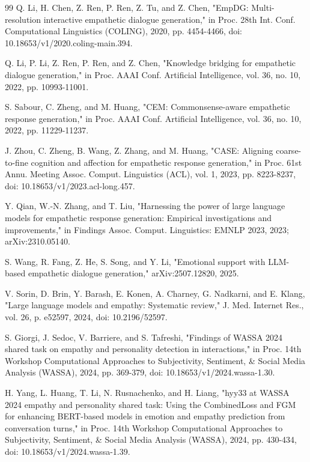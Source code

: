 \begin{thebibliography}{99}
Q. Li, H. Chen, Z. Ren, P. Ren, Z. Tu, and Z. Chen, "EmpDG: Multi-resolution interactive empathetic dialogue generation," in Proc. 28th Int. Conf. Computational Linguistics (COLING), 2020, pp. 4454-4466, doi: 10.18653/v1/2020.coling-main.394.

Q. Li, P. Li, Z. Ren, P. Ren, and Z. Chen, "Knowledge bridging for empathetic dialogue generation," in Proc. AAAI Conf. Artificial Intelligence, vol. 36, no. 10, 2022, pp. 10993-11001.

S. Sabour, C. Zheng, and M. Huang, "CEM: Commonsense-aware empathetic response generation," in Proc. AAAI Conf. Artificial Intelligence, vol. 36, no. 10, 2022, pp. 11229-11237.

J. Zhou, C. Zheng, B. Wang, Z. Zhang, and M. Huang, "CASE: Aligning coarse-to-fine cognition and affection for empathetic response generation," in Proc. 61st Annu. Meeting Assoc. Comput. Linguistics (ACL), vol. 1, 2023, pp. 8223-8237, doi: 10.18653/v1/2023.acl-long.457.

Y. Qian, W.-N. Zhang, and T. Liu, "Harnessing the power of large language models for empathetic response generation: Empirical investigations and improvements," in Findings Assoc. Comput. Linguistics: EMNLP 2023, 2023; arXiv:2310.05140.

S. Wang, R. Fang, Z. He, S. Song, and Y. Li, "Emotional support with LLM-based empathetic dialogue generation," arXiv:2507.12820, 2025.

V. Sorin, D. Brin, Y. Barash, E. Konen, A. Charney, G. Nadkarni, and E. Klang, "Large language models and empathy: Systematic review," J. Med. Internet Res., vol. 26, p. e52597, 2024, doi: 10.2196/52597.

S. Giorgi, J. Sedoc, V. Barriere, and S. Tafreshi, "Findings of WASSA 2024 shared task on empathy and personality detection in interactions," in Proc. 14th Workshop Computational Approaches to Subjectivity, Sentiment, \& Social Media Analysis (WASSA), 2024, pp. 369-379, doi: 10.18653/v1/2024.wassa-1.30.

H. Yang, L. Huang, T. Li, N. Rusnachenko, and H. Liang, "hyy33 at WASSA 2024 empathy and personality shared task: Using the CombinedLoss and FGM for enhancing BERT-based models in emotion and empathy prediction from conversation turns," in Proc. 14th Workshop Computational Approaches to Subjectivity, Sentiment, \& Social Media Analysis (WASSA), 2024, pp. 430-434, doi: 10.18653/v1/2024.wassa-1.39.


\end{thebibliography}
